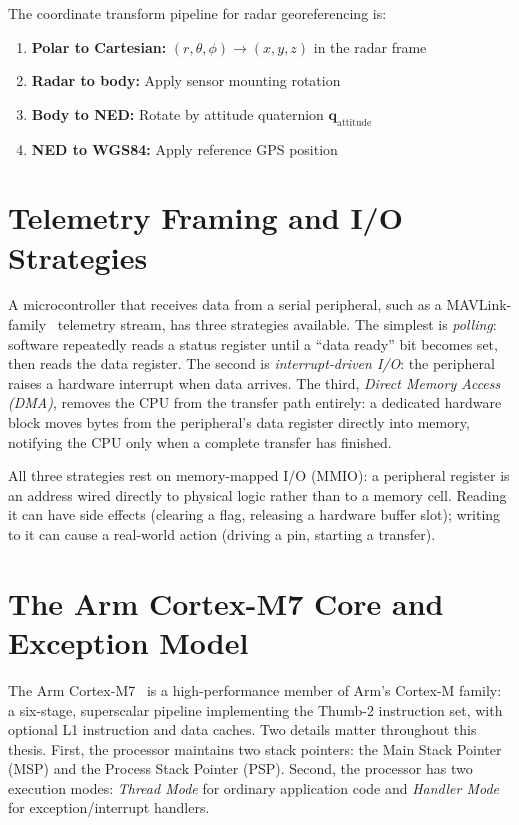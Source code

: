 The coordinate transform pipeline for radar georeferencing is:
\begin{enumerate}
\item \textbf{Polar to Cartesian:} $(r, \theta, \phi) \rightarrow (x, y, z)$ in the radar frame
\item \textbf{Radar to body:} Apply sensor mounting rotation
\item \textbf{Body to NED:} Rotate by attitude quaternion $\mathbf{q}_{\text{attitude}}$
\item \textbf{NED to WGS84:} Apply reference GPS position
\end{enumerate}

\section{Telemetry Framing and I/O Strategies}

A microcontroller that receives data from a serial peripheral, such as a MAVLink-family~\cite{mavlink} telemetry stream, has three strategies available. The simplest is \emph{polling}: software repeatedly reads a status register until a ``data ready'' bit becomes set, then reads the data register. The second is \emph{interrupt-driven I/O}: the peripheral raises a hardware interrupt when data arrives. The third, \emph{Direct Memory Access (DMA)}, removes the CPU from the transfer path entirely: a dedicated hardware block moves bytes from the peripheral's data register directly into memory, notifying the CPU only when a complete transfer has finished.

All three strategies rest on memory-mapped I/O (MMIO): a peripheral register is an address wired directly to physical logic rather than to a memory cell. Reading it can have side effects (clearing a flag, releasing a hardware buffer slot); writing to it can cause a real-world action (driving a pin, starting a transfer).

\section{The Arm Cortex-M7 Core and Exception Model}

The Arm Cortex-M7~\cite{armcm7trm} is a high-performance member of Arm's Cortex-M family: a six-stage, superscalar pipeline implementing the Thumb-2 instruction set, with optional L1 instruction and data caches. Two details matter throughout this thesis. First, the processor maintains two stack pointers: the Main Stack Pointer (MSP) and the Process Stack Pointer (PSP). Second, the processor has two execution modes: \emph{Thread Mode} for ordinary application code and \emph{Handler Mode} for exception/interrupt handlers.


